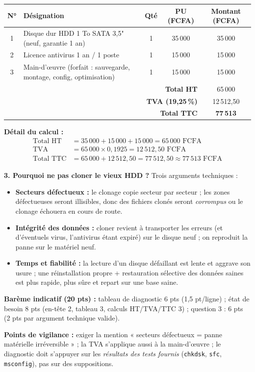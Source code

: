 \documentclass[11pt]{article}
\begin{document}
\begin{corrige}
\begin{center}
\begin{tabularx}{\linewidth}{|c|X|c|c|c|}\hline
\rowcolor{popblueL}
\textbf{N°} & \textbf{Désignation} & \textbf{Qté} & \textbf{PU (FCFA)} & \textbf{Montant (FCFA)} \\\hline
1 & Disque dur HDD 1 To SATA 3,5" (neuf, garantie 1 an) & 1 & 35\,000 & 35\,000 \\\hline
2 & Licence antivirus 1 an / 1 poste & 1 & 15\,000 & 15\,000 \\\hline
3 & Main-d'œuvre (forfait : sauvegarde, montage, config, optimisation) & 1 & 15\,000 & 15\,000 \\\hline
\multicolumn{4}{|r|}{\textbf{Total HT}} & 65\,000 \\\hline
\multicolumn{4}{|r|}{\textbf{TVA (19,25\,\%)}} & 12\,512,50 \\\hline
\multicolumn{4}{|r|}{\textbf{Total TTC}} & \textbf{77\,513} \\\hline
\end{tabularx}
\end{center}

\textbf{Détail du calcul :}
\begin{align*}
\text{Total HT} &= 35\,000 + 15\,000 + 15\,000 = 65\,000 \text{ FCFA} \\
\text{TVA} &= 65\,000 \times 0{,}1925 = 12\,512{,}50 \text{ FCFA} \\
\text{Total TTC} &= 65\,000 + 12\,512{,}50 = 77\,512{,}50 \approx 77\,513 \text{ FCFA}
\end{align*}

\textbf{3. Pourquoi ne pas cloner le vieux HDD ?} Trois arguments techniques :
\begin{itemize}
    \item \textbf{Secteurs défectueux :} le clonage copie secteur par secteur ; les zones défectueuses seront illisibles, donc des fichiers clonés seront \emph{corrompus} ou le clonage échouera en cours de route.
    \item \textbf{Intégrité des données :} cloner revient à transporter les erreurs (et d'éventuels virus, l'antivirus étant expiré) sur le disque neuf ; on reproduit la panne sur le matériel neuf.
    \item \textbf{Temps et fiabilité :} la lecture d'un disque défaillant est lente et aggrave son usure ; une réinstallation propre + restauration sélective des données saines est plus rapide, plus sûre et repart sur une base saine.
\end{itemize}

\textbf{Barème indicatif (20 pts) :} tableau de diagnostic 6 pts (1,5 pt/ligne) ; état de besoin 8 pts (en-tête 2, tableau 3, calculs HT/TVA/TTC 3) ; question 3 : 6 pts (2 pts par argument technique valide).

\textbf{Points de vigilance :} exiger la mention « secteurs défectueux = panne matérielle irréversible » ; la TVA s'applique aussi à la main-d'œuvre ; le diagnostic doit s'appuyer sur les \emph{résultats des tests fournis} (\texttt{chkdsk}, \texttt{sfc}, \texttt{msconfig}), pas sur des suppositions.
\end{corrige}
\end{document}
